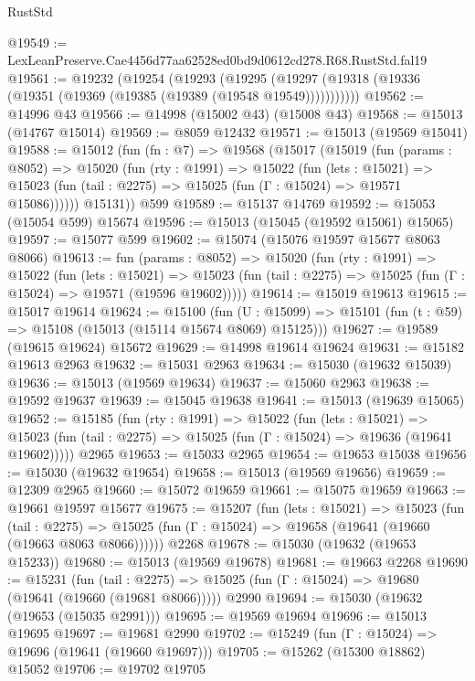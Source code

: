 \begin{lexlean}{RustStd}
\begin{coremodule}
@19549 := LexLeanPreserve.Cae4456d77aa62528ed0bd9d0612cd278.R68.RustStd.fal19
@19561 := @19232
    (@19254
      (@19293
        (@19295 (@19297 (@19318 (@19336 (@19351 (@19369 (@19385 (@19389 (@19548 @19549)))))))))))
@19562 := @14996 @43
@19566 := @14998 (@15002 @43) (@15008 @43)
@19568 := @15013 (@14767 @15014)
@19569 := @8059 @12432
@19571 := @15013 (@19569 @15041)
@19588 := @15012
    (fun (fn : @7) =>
    @19568
      (@15017
        (@15019
          (fun (params : @8052) =>
          @15020
            (fun (rty : @1991) =>
            @15022
              (fun (lets : @15021) =>
              @15023 (fun (tail : @2275) => @15025 (fun (Γ : @15024) => @19571 @15086))))))
        @15131))
    @599
@19589 := @15137 @14769
@19592 := @15053 (@15054 @599) @15674
@19596 := @15013 (@15045 (@19592 @15061) @15065)
@19597 := @15077 @599
@19602 := @15074 (@15076 @19597 @15677 @8063 @8066)
@19613 := fun (params : @8052) =>
  @15020
    (fun (rty : @1991) =>
    @15022
      (fun (lets : @15021) =>
      @15023 (fun (tail : @2275) => @15025 (fun (Γ : @15024) => @19571 (@19596 @19602)))))
@19614 := @15019 @19613
@19615 := @15017 @19614
@19624 := @15100
    (fun (U : @15099) => @15101 (fun (t : @59) => @15108 (@15013 (@15114 @15674 @8069) @15125)))
@19627 := @19589 (@19615 @19624) @15672
@19629 := @14998 @19614 @19624
@19631 := @15182 @19613 @2963
@19632 := @15031 @2963
@19634 := @15030 (@19632 @15039)
@19636 := @15013 (@19569 @19634)
@19637 := @15060 @2963
@19638 := @19592 @19637
@19639 := @15045 @19638
@19641 := @15013 (@19639 @15065)
@19652 := @15185
    (fun (rty : @1991) =>
    @15022
      (fun (lets : @15021) =>
      @15023 (fun (tail : @2275) => @15025 (fun (Γ : @15024) => @19636 (@19641 @19602)))))
    @2965
@19653 := @15033 @2965
@19654 := @19653 @15038
@19656 := @15030 (@19632 @19654)
@19658 := @15013 (@19569 @19656)
@19659 := @12309 @2965
@19660 := @15072 @19659
@19661 := @15075 @19659
@19663 := @19661 @19597 @15677
@19675 := @15207
    (fun (lets : @15021) =>
    @15023
      (fun (tail : @2275) =>
      @15025 (fun (Γ : @15024) => @19658 (@19641 (@19660 (@19663 @8063 @8066))))))
    @2268
@19678 := @15030 (@19632 (@19653 @15233))
@19680 := @15013 (@19569 @19678)
@19681 := @19663 @2268
@19690 := @15231
    (fun (tail : @2275) => @15025 (fun (Γ : @15024) => @19680 (@19641 (@19660 (@19681 @8066)))))
    @2990
@19694 := @15030 (@19632 (@19653 (@15035 @2991)))
@19695 := @19569 @19694
@19696 := @15013 @19695
@19697 := @19681 @2990
@19702 := @15249 (fun (Γ : @15024) => @19696 (@19641 (@19660 @19697)))
@19705 := @15262 (@15300 @18862) @15052
@19706 := @19702 @19705

\end{coremodule}
\end{lexlean}
